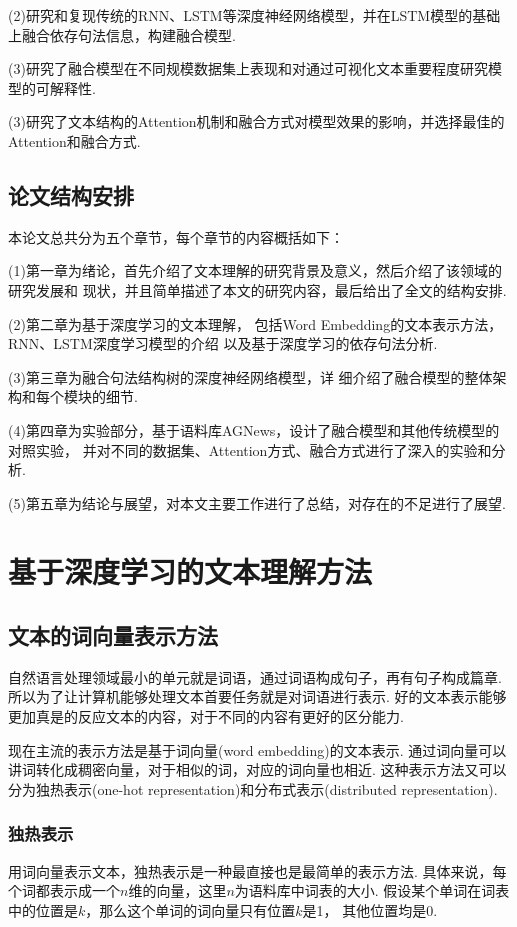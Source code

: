 \documentclass[bachelor,adobefonts]{jnuthesis}
\begin{document}
(2)研究和复现传统的RNN、LSTM等深度神经网络模型，并在LSTM模型的基础上融合依存句法信息，构建融合模型.

(3)研究了融合模型在不同规模数据集上表现和对通过可视化文本重要程度研究模型的可解释性.

(3)研究了文本结构的Attention机制和融合方式对模型效果的影响，并选择最佳的Attention和融合方式.

\section{论文结构安排}
本论文总共分为五个章节，每个章节的内容概括如下：

(1)第一章为绪论，首先介绍了文本理解的研究背景及意义，然后介绍了该领域的研究发展和 现状，并且简单描述了本文的研究内容，最后给出了全文的结构安排.

(2)第二章为基于深度学习的文本理解，
包括Word Embedding的文本表示方法，RNN、LSTM深度学习模型的介绍
以及基于深度学习的依存句法分析.

(3)第三章为融合句法结构树的深度神经网络模型，详
细介绍了融合模型的整体架构和每个模块的细节.

(4)第四章为实验部分，基于语料库AGNews，设计了融合模型和其他传统模型的对照实验，
并对不同的数据集、Attention方式、融合方式进行了深入的实验和分析.

(5)第五章为结论与展望，对本文主要工作进行了总结，对存在的不足进行了展望.


\chapter{基于深度学习的文本理解方法}
\section{文本的词向量表示方法}
自然语言处理领域最小的单元就是词语，通过词语构成句子，再有句子构成篇章.
所以为了让计算机能够处理文本首要任务就是对词语进行表示.
好的文本表示能够更加真是的反应文本的内容，对于不同的内容有更好的区分能力.

现在主流的表示方法是基于词向量(word embedding)的文本表示.
通过词向量可以讲词转化成稠密向量，对于相似的词，对应的词向量也相近.
这种表示方法又可以分为独热表示(one-hot representation)和分布式表示(distributed representation).

\subsection{独热表示}
用词向量表示文本，独热表示是一种最直接也是最简单的表示方法.
具体来说，每个词都表示成一个$n$维的向量，这里$n$为语料库中词表的大小.
假设某个单词在词表中的位置是$k$，那么这个单词的词向量只有位置$k$是1，
其他位置均是0.
\end{document}
